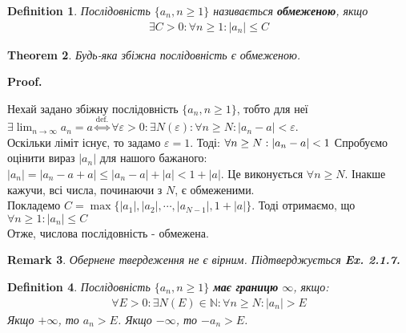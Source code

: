\documentclass[a4paper, 14pt]{article}
\makeatletter
\def\qed{$\blacksquare$}
\theoremstyle{theoremdd}
\newtheorem{theorem}{Theorem}[subsection]
\theoremstyle{theoremdd}
\newtheorem{definition}[theorem]{Definition}
\theoremstyle{theoremdd}
\theoremstyle{theoremdd}
\theoremstyle{theoremdd}
\theoremstyle{theoremdd}
\newtheorem{remark}[theorem]{Remark}
\theoremstyle{theoremdd}
\theoremstyle{theoremdd}
\renewenvironment{proof}[1][Proof.\\]{\par
\pushQED{\hfill \qed}%
\normalfont \topsep6\p@\@plus6\p@\relax
\trivlist
\item\relax
{\bfseries
#1\@addpunct{.}}\hspace\labelsep\ignorespaces
}{%
\popQED\endtrivlist\@endpefalse
}
\makeatother
\begin{document}
	\begin{definition}
	Послідовність $\{a_n, n \geq 1\}$ називається \textbf{обмеженою}, якщо
	\begin{align*}
	\exists C>0: \forall n \geq 1: |a_n|\leq C
	\end{align*}
	\end{definition}
	
	\begin{theorem}
	Будь-яка збіжна послідовність є обмеженою.
	\end{theorem}
	
	\begin{proof}
	Нехай задано збіжну послідовність $\{a_n, n \geq 1\}$, тобто для неї\\ $\displaystyle \exists \lim_{n \to \infty} a_n = a \overset{\textrm{def.}}{\iff}\forall \varepsilon > 0: \exists N(\varepsilon): \forall n \geq N: |a_n-a| < \varepsilon$.\\
	Оскільки ліміт існує, то задамо $\varepsilon = 1$. Тоді: $\forall n \geq N: \abs{a_n-a}<1$
	Спробуємо оцінити вираз $|a_n|$ для нашого бажаного:\\
	$|a_n| = |a_n - a + a| \leq |a_n-a|+|a| < 1 + |a|$. Це виконується $\forall n \geq N$. Інакше кажучи, всі числа, починаючи з $N$, є обмеженими.\\
	Покладемо $C=\max\{|a_1|,|a_2|,\cdots, |a_{N-1}|, 1+|a|\}$. Тоді отримаємо, що $\forall n\geq1: |a_n|\leq C$ \\ 
	Отже, числова послідовність - обмежена.
	\end{proof}
	
	\begin{remark}
	Обернене твердеження не є вірним. Підтверджується \textbf{Ex. 2.1.7.}
	\end{remark}
	
	\begin{definition}
	Послідовність $\{a_n, n \geq 1\}$ \textbf{має границю} $\infty$, якщо: 			\begin{align*}
	\forall E>0: \exists N(E) \in \mathbb{N}: \forall n \geq N: |a_n|>E
	\end{align*}
	Якщо $+\infty$, то $a_n > E$. \hspace{0.5cm} Якщо $-\infty$, то $-a_n > E$.
	\end{definition}
	
\end{document}
